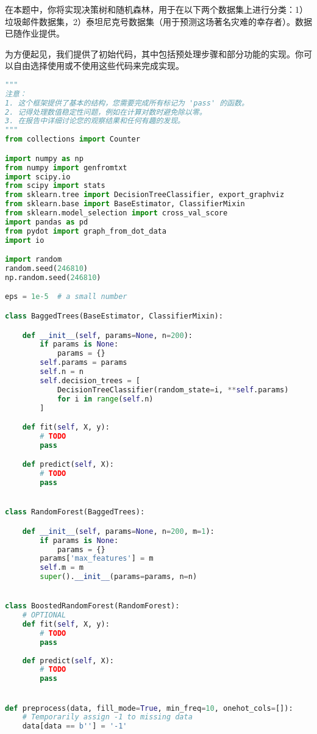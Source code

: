 \documentclass[8pt]{article}
\begin{document}
在本题中，你将实现决策树和随机森林，用于在以下两个数据集上进行分类：1）垃圾邮件数据集，2）泰坦尼克号数据集（用于预测这场著名灾难的幸存者）。数据已随作业提供。

为方便起见，我们提供了初始代码，其中包括预处理步骤和部分功能的实现。你可以自由选择使用或不使用这些代码来完成实现。

\begin{lstlisting}[language=Python, caption=随机森林模型接口]
"""
注意：
1. 这个框架提供了基本的结构，您需要完成所有标记为 'pass' 的函数。
2. 记得处理数值稳定性问题，例如在计算对数时避免除以零。
3. 在报告中详细讨论您的观察结果和任何有趣的发现。
"""
from collections import Counter

import numpy as np
from numpy import genfromtxt
import scipy.io
from scipy import stats
from sklearn.tree import DecisionTreeClassifier, export_graphviz
from sklearn.base import BaseEstimator, ClassifierMixin
from sklearn.model_selection import cross_val_score
import pandas as pd
from pydot import graph_from_dot_data
import io

import random
random.seed(246810)
np.random.seed(246810)

eps = 1e-5  # a small number

class BaggedTrees(BaseEstimator, ClassifierMixin):

    def __init__(self, params=None, n=200):
        if params is None:
            params = {}
        self.params = params
        self.n = n
        self.decision_trees = [
            DecisionTreeClassifier(random_state=i, **self.params)
            for i in range(self.n)
        ]

    def fit(self, X, y):
        # TODO
        pass

    def predict(self, X):
        # TODO
        pass


class RandomForest(BaggedTrees):

    def __init__(self, params=None, n=200, m=1):
        if params is None:
            params = {}
        params['max_features'] = m
        self.m = m
        super().__init__(params=params, n=n)


class BoostedRandomForest(RandomForest):
    # OPTIONAL
    def fit(self, X, y):
        # TODO
        pass
    
    def predict(self, X):
        # TODO
        pass


def preprocess(data, fill_mode=True, min_freq=10, onehot_cols=[]):
    # Temporarily assign -1 to missing data
    data[data == b''] = '-1'


\end{lstlisting}
\end{document}
